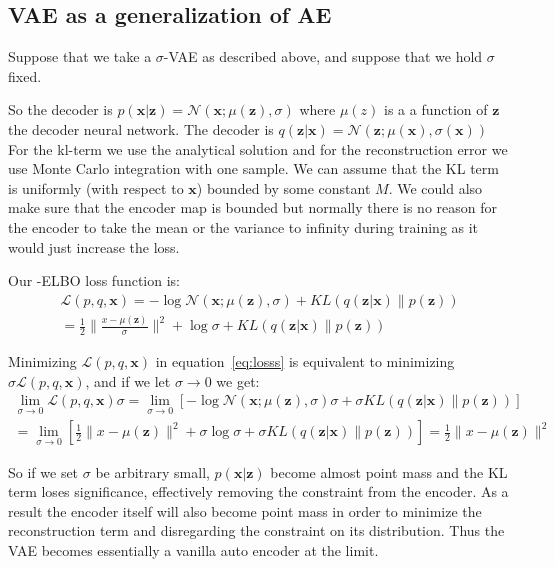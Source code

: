\documentclass[11pt, a4paper]{report}
\theoremstyle{plain}
\theoremstyle{definition}
\theoremstyle{remark}
\newcommand{\x}{\mathbf{x}}
\newcommand{\z}{\mathbf{z}}
\newcommand{\LL}{\mathcal{L}}
\newcommand{\NN}{\mathcal{N}}
\begin{document}
\subsection{VAE as a generalization of AE}
Suppose that we take a $\sigma$-VAE as described above, and suppose that we hold
$\sigma$ fixed.

So the decoder is $p(\x | \z) = \NN(\x ; \mu(\z), \sigma)$ where $\mu(z)$ is a a
function of $\z$ the decoder neural network. The decoder is $q(\z | \x) = \NN(\z
; \mu(\x), \sigma(\x))$ For the kl-term we use the analytical solution and for
the reconstruction error we use Monte Carlo integration with one sample. We can
assume that the KL term is uniformly (with respect to $\x$) bounded by some
constant $M$. We could also make sure that the encoder map is bounded but
normally there is no reason for the encoder to take the mean or the variance to
infinity during training as it would just increase the loss.

Our -ELBO loss function is:
\begin{equation}
\begin{aligned}
\LL(p,q, \x) = -\log \NN(\x; \mu(\z), \sigma) + KL(q(\z | \x) \| p(\z)) \\
= \frac{1}{2}\|\frac{x - \mu(\z)}{\sigma}\|^2 + \log \sigma + KL(q(\z | \x) \| p(\z))
\end{aligned}
\label{eq:losss}
\end{equation}

Minimizing $\LL(p,q,\x)$ in equation~\ref{eq:losss} is equivalent to minimizing 
$\sigma \LL(p,q,\x)$, and if we let $\sigma \to 0$ we get:
\begin{equation}
\begin{aligned}
\lim_{\sigma \rightarrow 0} \LL(p,q, \x) \sigma 
= \lim_{\sigma \to 0}[ -\log \NN(\x; \mu(\z), \sigma) \sigma + \sigma KL(q(\z |
\x) \| p(\z))] \\
= \lim_{\sigma \to 0} [\frac{1}{2}\|x - \mu(\z)\|^2 + \sigma \log \sigma  +
\sigma KL(q(\z | \x) \| p(\z))] = 
\frac{1}{2}\|x - \mu(\z)\|^2
\end{aligned}
\label{eq:lossss}
\end{equation}

So if we set $\sigma$ be arbitrary small, $p(\x | \z)$ become almost point mass
and the KL term loses significance, effectively removing the constraint from the
encoder. As a result the encoder itself
will also become point mass in order to minimize the reconstruction term and
disregarding the constraint on its distribution.
Thus the VAE becomes essentially a vanilla auto encoder at the limit.
\end{document}
